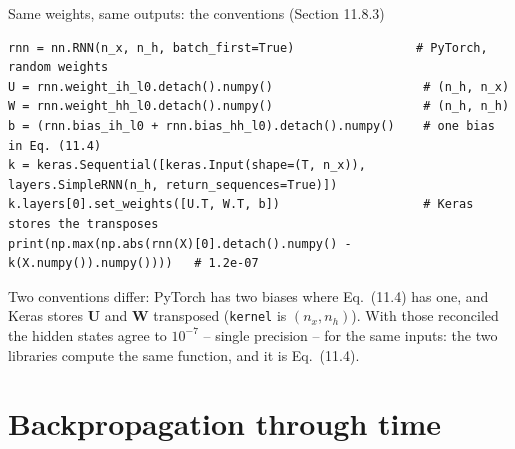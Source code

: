 \documentclass[10pt,aspectratio=169]{beamer}
\begin{document}
\begin{frame}[fragile]{Same weights, same outputs: the conventions (Section 11.8.3)}
\begin{lstlisting}
rnn = nn.RNN(n_x, n_h, batch_first=True)                 # PyTorch, random weights
U = rnn.weight_ih_l0.detach().numpy()                     # (n_h, n_x)
W = rnn.weight_hh_l0.detach().numpy()                     # (n_h, n_h)
b = (rnn.bias_ih_l0 + rnn.bias_hh_l0).detach().numpy()    # one bias in Eq. (11.4)
k = keras.Sequential([keras.Input(shape=(T, n_x)), layers.SimpleRNN(n_h, return_sequences=True)])
k.layers[0].set_weights([U.T, W.T, b])                    # Keras stores the transposes
print(np.max(np.abs(rnn(X)[0].detach().numpy() - k(X.numpy()).numpy())))   # 1.2e-07
\end{lstlisting}
\small
Two conventions differ: PyTorch has two biases where Eq.~(11.4) has one,
and Keras stores $\bm{U}$ and $\bm{W}$ transposed (\texttt{kernel} is
$(n_x,n_h)$).  With those reconciled the hidden states agree to $10^{-7}$
-- single precision -- for the same inputs: the two libraries compute the
same function, and it is Eq.~(11.4).
\end{frame}


\section{Backpropagation through time}
\end{document}
